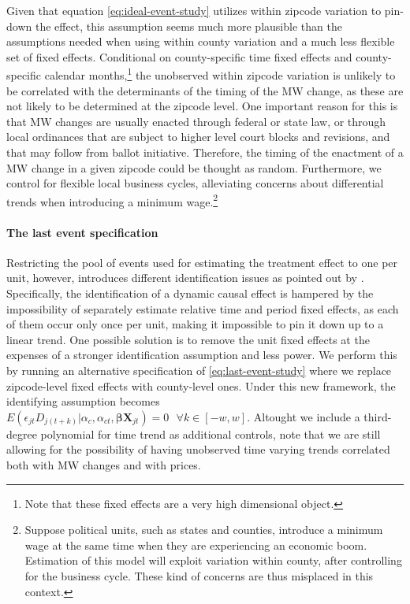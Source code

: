    Given that equation \eqref{eq:ideal-event-study} utilizes within zipcode variation to pin-down the effect, this assumption seems much more plausible than the assumptions needed when using within county variation and a much less flexible set of fixed effects. Conditional on county-specific time fixed effects and county-specific calendar months,\footnote{Note that these fixed effects are a very high dimensional object.} the unobserved within zipcode variation is unlikely to be correlated with the determinants of the timing of the MW change, as these are not likely to be determined at the zipcode level. One important reason for this is that MW changes are usually enacted through federal or state law, or through local ordinances that are subject to higher level court blocks and revisions, and that may follow from ballot initiative. Therefore, the timing of the enactment of a MW change in a given zipcode could be thought as random. Furthermore, we control for flexible local business cycles, alleviating concerns about differential trends when introducing a minimum wage.\footnote{Suppose political units, such as states and counties, introduce a minimum wage at the same time when they are experiencing an economic boom. Estimation of this model will exploit variation within county, after controlling for the business cycle. These kind of concerns are thus misplaced in this context.}
    
    \paragraph{The last event specification}
    
    Restricting the pool of events used for estimating the treatment effect to one per unit, however, introduces different identification issues as pointed out by \textcite{borusyak2017revisiting}. Specifically, the identification of a dynamic causal effect is hampered by the impossibility of separately estimate relative time and period fixed effects, as each of them occur only once per unit, making it impossible to pin it down up to a linear trend. One possible solution is to remove the unit fixed effects at the expenses of a stronger identification assumption and less power. We perform this by running an alternative specification of \eqref{eq:last-event-study} where we replace zipcode-level fixed effects with county-level ones. Under this new framework, the identifying assumption becomes $E \left( \epsilon_{jt} D_{j(t+k)} | \alpha_c, \alpha_{ct}, \boldsymbol{\beta} \boldsymbol{X}_{jt}\right)  = 0  \ \ \ \forall k\in[-w, w]$. Altought we include a third-degree polynomial for time trend as additional controls, note that we are still allowing for the possibility of having unobserved time varying trends correlated both with MW changes and with prices. 
    
